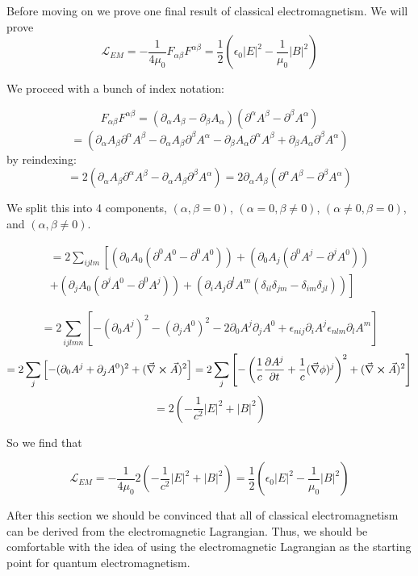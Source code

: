 \documentclass[12pt]{article}
\newcommand{\pardiv}[2][]{\frac{\partial #1}{\partial #2}}
\newcommand{\vecnab}{\vec{\nabla}}
\begin{document}
Before moving on we prove one final result of classical electromagnetism.
We will prove
\[\mathcal{L}_{EM} = -\frac{1}{4\mu_0} F_{\alpha \beta} F^{\alpha \beta} = \frac{1}{2} \left(\epsilon_0 |E|^2 - \frac{1}{\mu_0} |B|^2 \right) \]

We proceed with a bunch of index notation:

\[ F_{\alpha \beta}F^{\alpha \beta} = (\partial_{\alpha} A_{\beta} - \partial_{\beta} A_{\alpha})(\partial^{\alpha} A^{\beta} - \partial^{\beta} A^{\alpha})  \]
\[ = (\partial_{\alpha} A_{\beta} \partial^{\alpha} A^{\beta} - \partial_{\alpha} A_{\beta} \partial^{\beta} A^{\alpha} - \partial_{\beta} A_{\alpha} \partial^{\alpha} A^{\beta} + \partial_{\beta} A_{\alpha} \partial^{\beta} A^{\alpha})  \]
by reindexing:
\[ = 2 (\partial_{\alpha} A_{\beta} \partial^{\alpha} A^{\beta} - \partial_{\alpha} A_{\beta} \partial^{\beta} A^{\alpha}) = 2\partial_{\alpha} A_{\beta} ( \partial^{\alpha} A^{\beta} - \partial^{\beta} A^{\alpha})     \]

We split this into 4 components, $(\alpha,\beta =0)$, $(\alpha=0,\beta \neq 0)$, $(\alpha\neq 0, \beta=0)$, and $(\alpha,\beta \neq 0)$.


\begin{align*}
 = 2 \sum_{ijlm} \left[ \left( \partial_0 A_0(\partial^0 A^0 - \partial^0 A^0) \right) + \left(\partial_0 A_j (\partial^0 A^j - \partial^j A^0) \right)\right. \\+ 
  \left.\left( \partial_j A_0 (\partial^j A^0 - \partial^0 A^j) \right) + \left(\partial_i A_j \partial^l A^m (\delta_{il} \delta_{jm} - \delta_{im} \delta_{jl})\right)  \right]    
\end{align*}


\[ = 2\sum_{ijlmn} \left[ -(\partial_0 A^j)^2 -(\partial_j A^0)^2 -2 \partial_0 A^j \partial_j A^0 + \epsilon_{nij}\partial_i A^j \epsilon_{nlm} \partial_l A^m \right]\]
\[ = 2 \sum_j \left[ - (\partial_0 A^j + \partial_j A^0)^2 + (\vecnab \cross \vec{A})^2 \right] = 2 \sum_j \left[ -\left(\frac{1}{c}\pardiv[A^j]{t} + \frac{1}{c} (\vecnab \phi)^j   \right)^2 +(\vecnab \cross \vec{A})^2 \right ]\]
\[ = 2 \left(-\frac{1}{c^2}|E|^2+|B|^2\right) \]

So we find that

\[\mathcal{L}_{EM} = -\frac{1}{4\mu_0} 2 \left(-\frac{1}{c^2}|E|^2+|B|^2\right) = \frac{1}{2}\left( \epsilon_0 |E|^2 -\frac{1}{\mu_0} |B|^2\right)    \]

After this section we should be convinced that all of classical electromagnetism can be derived from the electromagnetic Lagrangian. Thus, we should be comfortable with the idea of using the electromagnetic Lagrangian as the starting point for quantum electromagnetism.
\end{document}
